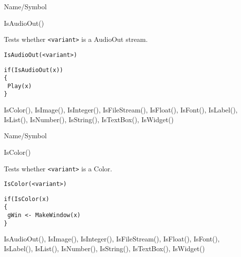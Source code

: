\begin{desc}{Name/Symbol}
\item[Name/Symbol]	IsAudioOut()

\item[Description]	Tests whether \verb+<variant>+ is a AudioOut stream.

\item[Usage]
\begin{verbatim}
IsAudioOut(<variant>)
\end{verbatim}

\item[Example]
\begin{verbatim}
if(IsAudioOut(x))
{
 Play(x)
}
\end{verbatim}

\item[See Also]	IsColor(), IsImage(), IsInteger(), IsFileStream(), 
		IsFloat(), IsFont(), IsLabel(), IsList(), IsNumber(), 
		IsString(), IsTextBox(), IsWidget()
\end{desc}

\rl


\begin{desc}{Name/Symbol}
\item[Name/Symbol]	IsColor()

\item[Description]	Tests whether \verb+<variant>+ is a Color.

\item[Usage]
\begin{verbatim}
IsColor(<variant>)
\end{verbatim}

\item[Example]
\begin{verbatim}
if(IsColor(x)
{
 gWin <- MakeWindow(x)
}
\end{verbatim}

\item[See Also]		IsAudioOut(), IsImage(), IsInteger(), IsFileStream(), IsFloat(), IsFont(), IsLabel(), IsList(), IsNumber(), IsString(), IsTextBox(), IsWidget()
\end{desc}

\rl




